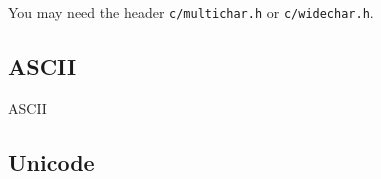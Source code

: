 
You may need the header \verb|c/multichar.h| or \verb|c/widechar.h|.

\subsection{ASCII}

{ASCII}

\subsection{Unicode}


